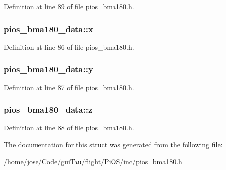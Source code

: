 Definition at line 89 of file pios\-\_\-bma180.\-h.

\hypertarget{structpios__bma180__data_ab20204f27147fd128d19681833d58a46}{
\subsubsection[{x}]{ pios\-\_\-bma180\-\_\-data\-::x}}\label{structpios__bma180__data_ab20204f27147fd128d19681833d58a46}


Definition at line 86 of file pios\-\_\-bma180.\-h.

\hypertarget{structpios__bma180__data_ac27d83e52f78250976c48fd43d6c7512}{
\subsubsection[{y}]{ pios\-\_\-bma180\-\_\-data\-::y}}\label{structpios__bma180__data_ac27d83e52f78250976c48fd43d6c7512}


Definition at line 87 of file pios\-\_\-bma180.\-h.

\hypertarget{structpios__bma180__data_ac424fcb7679ca4c9956a8c80ad486cc6}{
\subsubsection[{z}]{ pios\-\_\-bma180\-\_\-data\-::z}}\label{structpios__bma180__data_ac424fcb7679ca4c9956a8c80ad486cc6}


Definition at line 88 of file pios\-\_\-bma180.\-h.



The documentation for this struct was generated from the following file\-:\begin{DoxyCompactItemize}
\item 
/home/jose/\-Code/gui\-Tau/flight/\-Pi\-O\-S/inc/\hyperlink{pios__bma180_8h}{pios\-\_\-bma180.\-h}\end{DoxyCompactItemize}
